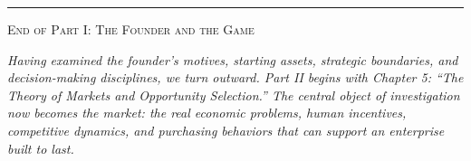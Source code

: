 \vspace{0.8em}
\noindent\rule{\linewidth}{0.4pt}
\vspace{0.4em}

\begin{center}
\small\scshape End of Part I: The Founder and the Game
\end{center}

\noindent\textit{Having examined the founder's motives, starting assets, strategic boundaries, and decision-making disciplines, we turn outward. Part II begins with Chapter 5: ``The Theory of Markets and Opportunity Selection.'' The central object of investigation now becomes the market: the real economic problems, human incentives, competitive dynamics, and purchasing behaviors that can support an enterprise built to last.}
